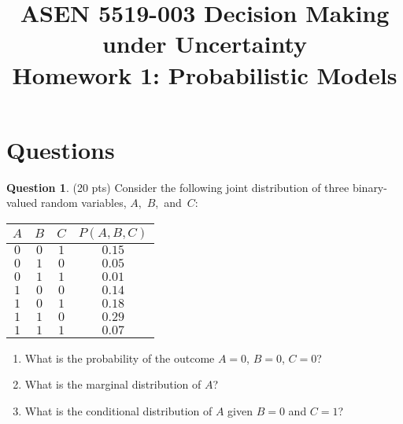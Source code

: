 \documentclass{article}
\title{ASEN 5519-003 Decision Making under Uncertainty\\
       Homework 1: Probabilistic Models}
\theoremstyle{definition}
\newtheorem{question}[thm]{Question}
\begin{document}
\maketitle

\section{Questions}

\begin{question} (20 pts)
    Consider the following joint distribution of three binary-valued random variables, \mbox{$A$, $B$, and $C$}:

    \begin{minipage}{0.3\linewidth}
        \vspace{1em}
    {\small
    \begin{tabular}{cccc}
        \toprule
            $A$ & $B$ & $C$ & $P(A,B,C)$ \\
        \midrule
            $0$ & $0$ & $1$ & $0.15$ \\
            $0$ & $1$ & $0$ & $0.05$ \\
            $0$ & $1$ & $1$ & $0.01$ \\
            $1$ & $0$ & $0$ & $0.14$ \\
            $1$ & $0$ & $1$ & $0.18$ \\
            $1$ & $1$ & $0$ & $0.29$ \\
            $1$ & $1$ & $1$ & $0.07$ \\
        \bottomrule
    \end{tabular}
    }
    \end{minipage}
    \begin{minipage}{0.7\linewidth}
        \begin{enumerate}[label=\alph*)]
            \item What is the probability of the outcome $A=0$, $B=0$, $C=0$?
            \item What is the marginal distribution of $A$?
            \item What is the conditional distribution of $A$ given $B=0$ and $C=1$?
        \end{enumerate}
    \end{minipage}
\end{question}
\end{document}
